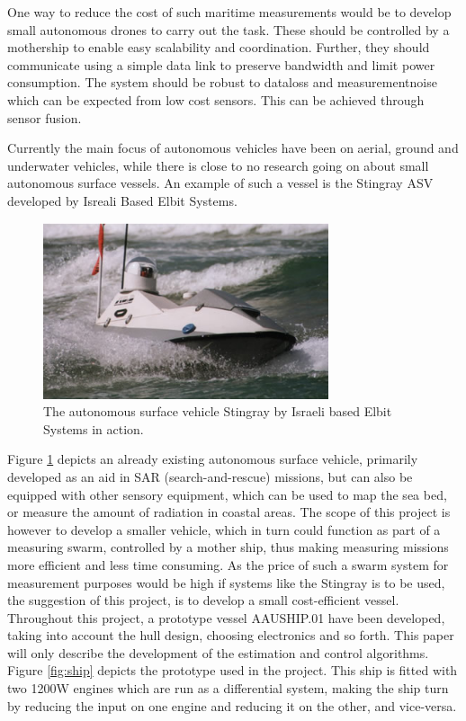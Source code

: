 \documentclass{ifacconf}
\begin{document}
One way to reduce the cost of such maritime measurements would be to develop small autonomous drones to carry out the task. These should be controlled by a mothership to enable easy scalability and coordination. Further, they should communicate using a simple data link to preserve bandwidth and limit power consumption. The system should be robust to dataloss and measurementnoise which can be expected from low cost sensors. This can be achieved through sensor fusion.

Currently the main focus of autonomous vehicles have been on aerial, ground and underwater vehicles, while there is close to no research going on about small autonomous surface vessels. An example of such a vessel is the Stingray ASV developed by Isreali Based Elbit Systems. 
\begin{figure}
	\begin{center}
		\includegraphics[width=8.4cm]{img/stingray.jpg} %
		\caption{The autonomous surface vehicle Stingray by Israeli based Elbit Systems in action.}  
		\label{fig:stingray}
	\end{center}
\end{figure}

Figure \ref{fig:stingray} depicts an already existing autonomous surface vehicle, primarily developed as an aid in SAR (search-and-rescue) missions, but can also be equipped with other sensory equipment, which can be used to map the sea bed, or measure the amount of radiation in coastal areas. The scope of this project is however to develop a smaller vehicle, which in turn could function as part of a measuring swarm, controlled by a mother ship, thus making measuring missions more efficient and less time consuming. As the price of such a swarm system for measurement purposes would be high if systems like the Stingray is to be used, the suggestion of this project, is to develop a small cost-efficient vessel. Throughout this project, a prototype vessel AAUSHIP.01 have been developed, taking into account the hull design, choosing electronics and so forth. This paper will only describe the development of the estimation and control algorithms. Figure \ref{fig:ship} depicts the prototype used in the project. This ship is fitted with two 1200W engines which are run as a differential system, making the ship turn by reducing the input on one engine and reducing it on the other, and vice-versa. 
\end{document}
